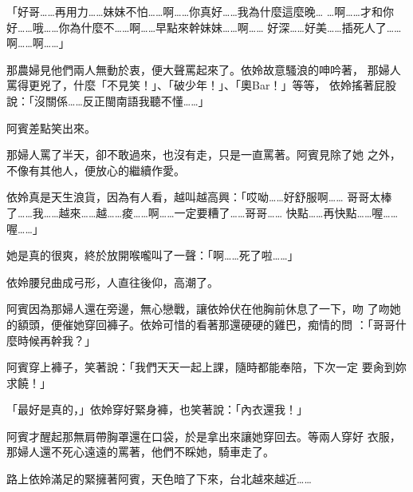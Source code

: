 「好哥……再用力……妹妹不怕……啊……你真好……我為什麼這麼晚…
…啊……才和你好……哦……你為什麼不……啊……早點來幹妹妹……啊……
好深……好美……插死人了……啊……啊……」

那農婦見他們兩人無動於衷，便大聲罵起來了。依姈故意騷浪的呻吟著，
那婦人罵得更兇了，什麼「不見笑！」、「破少年！」、「奧Bar！」等等，
依姈搖著屁股說：「沒關係……反正閩南語我聽不懂……」

阿賓差點笑出來。

那婦人罵了半天，卻不敢過來，也沒有走，只是一直罵著。阿賓見除了她
之外，不像有其他人，便放心的繼續作愛。

依姈真是天生浪貨，因為有人看，越叫越高興：「哎呦……好舒服啊……
哥哥太棒了……我……越來……越……痠……啊……一定要糟了……哥哥……
快點……再快點……喔……喔……」

她是真的很爽，終於放開喉嚨叫了一聲：「啊……死了啦……」

依姈腰兒曲成弓形，人直往後仰，高潮了。

阿賓因為那婦人還在旁邊，無心戀戰，讓依姈伏在他胸前休息了一下，吻
了吻她的額頭，便催她穿回褲子。依姈可惜的看著那還硬硬的雞巴，痴情的問
：「哥哥什麼時候再幹我？」

阿賓穿上褲子，笑著說：「我們天天一起上課，隨時都能奉陪，下次一定
要肏到妳求饒！」

「最好是真的，」依姈穿好緊身褲，也笑著說：「內衣還我！」

阿賓才醒起那無肩帶胸罩還在口袋，於是拿出來讓她穿回去。等兩人穿好
衣服，那婦人還不死心遠遠的罵著，他們不睬她，騎車走了。

路上依姈滿足的緊擁著阿賓，天色暗了下來，台北越來越近……










